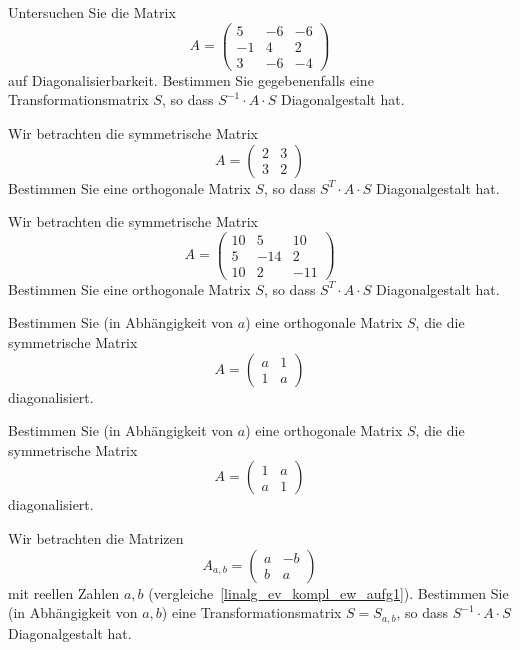 \begin{aufgabe} Untersuchen Sie die Matrix
  	$$ A =  \left( \begin{matrix} 5 & -6 & -6 \\ -1 & 4 & 2 \\ 3 & -6 & -4 \end{matrix} \right) $$
auf Diagonalisierbarkeit. Bestimmen Sie gegebenenfalls eine Transformationsmatrix $S$, 
so dass $S^{-1} \cdot A \cdot S$ Diagonalgestalt hat.
\end{aufgabe}

\begin{aufgabe} Wir betrachten die symmetrische Matrix 
  	$$  A =  \left( \begin{matrix} 2 & 3 \\3 & 2 \end{matrix} \right) $$
Bestimmen Sie eine orthogonale Matrix $S$, so dass $S^T \cdot A \cdot S$ Diagonalgestalt hat. 
\end{aufgabe}

\begin{aufgabe} Wir betrachten die symmetrische Matrix 
  	$$  A =  \left( \begin{matrix} 10 & 5 & 10 \\ 5 & -14 & 2 \\ 10 & 2 & -11 \end{matrix} \right) $$
Bestimmen Sie eine orthogonale Matrix $S$, so dass $S^T \cdot A \cdot S$ Diagonalgestalt hat. 
\end{aufgabe}

\begin{aufgabe} Bestimmen Sie (in Abhängigkeit von $a$) eine orthogonale Matrix $S$, die die symmetrische 
Matrix
  	$$ A =  \left( \begin{matrix} a & 1 \\ 1 & a \end{matrix} \right) $$
diagonalisiert.
\end{aufgabe}

\begin{aufgabe} Bestimmen Sie (in Abhängigkeit von $a$) eine orthogonale Matrix $S$, die die symmetrische 
Matrix
  	$$ A =  \left( \begin{matrix} 1 & a \\ a & 1 \end{matrix} \right) $$
diagonalisiert.
\end{aufgabe}

\begin{aufgabe} Wir betrachten die Matrizen
  	$$ A_{a,b} = \left( \begin{matrix} a & -b \\ b & a \end{matrix} \right) $$
mit reellen Zahlen $a,b$ (vergleiche~\ref{linalg_ev_kompl_ew_aufg1}). Bestimmen Sie  
(in Abhängigkeit von $a,b$) eine Transformationsmatrix $S = S_{a,b}$, so dass 
$S^{-1} \cdot A \cdot S$ Diagonalgestalt hat.
\end{aufgabe}

